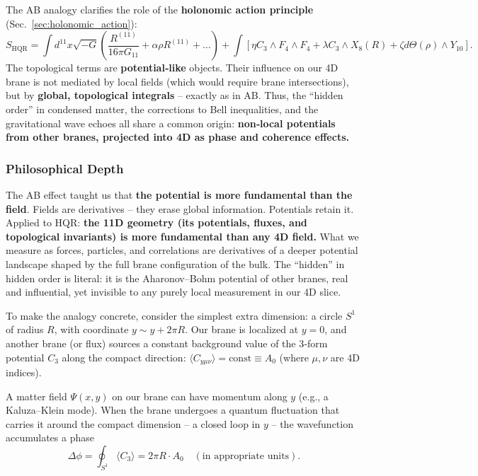 The AB analogy clarifies the role of the \textbf{holonomic action principle} (Sec.~\ref{sec:holonomic_action}):
\[
S_{\text{HQR}} = \int d^{11}x \sqrt{-G} \left( \frac{R^{(11)}}{16\pi G_{11}} + \alpha \rho R^{(11)} + \ldots \right)
+ \int \left[ \eta C_3 \wedge F_4 \wedge F_4 + \lambda C_3 \wedge X_8(R) + \zeta d\Theta(\rho) \wedge Y_{10} \right].
\]
The topological terms are \textbf{potential‑like} objects. Their influence on our 4D brane is not mediated by local fields
(which would require brane intersections), but by \textbf{global, topological integrals} – exactly as in AB.
Thus, the “hidden order” in condensed matter, the corrections to Bell inequalities, and the gravitational wave echoes
all share a common origin: \textbf{non‑local potentials from other branes, projected into 4D as phase and coherence effects.}

\subsubsection*{Philosophical Depth}

The AB effect taught us that \textbf{the potential is more fundamental than the field}.
Fields are derivatives – they erase global information. Potentials retain it.
Applied to HQR: \textbf{the 11D geometry (its potentials, fluxes, and topological invariants) is more fundamental
than any 4D field.} What we measure as forces, particles, and correlations are derivatives of a deeper potential landscape
shaped by the full brane configuration of the bulk. The “hidden” in hidden order is literal: it is the Aharonov–Bohm potential
of other branes, real and influential, yet invisible to any purely local measurement in our 4D slice.


To make the analogy concrete, consider the simplest extra dimension: a circle $S^1$ of radius $R$, with coordinate $y \sim y+2\pi R$.
Our brane is localized at $y=0$, and another brane (or flux) sources a constant background value of the 3‑form potential
$C_3$ along the compact direction: $\langle C_{y\mu\nu} \rangle = \text{const} \equiv A_0$ (where $\mu,\nu$ are 4D indices).

A matter field $\Psi(x,y)$ on our brane can have momentum along $y$ (e.g., a Kaluza–Klein mode). 
When the brane undergoes a quantum fluctuation that carries it around the compact dimension – a closed loop in $y$ – 
the wavefunction accumulates a phase
\[
\Delta \phi = \oint_{S^1} \langle C_3 \rangle = 2\pi R \cdot A_0 \quad (\text{in appropriate units}).
\]

